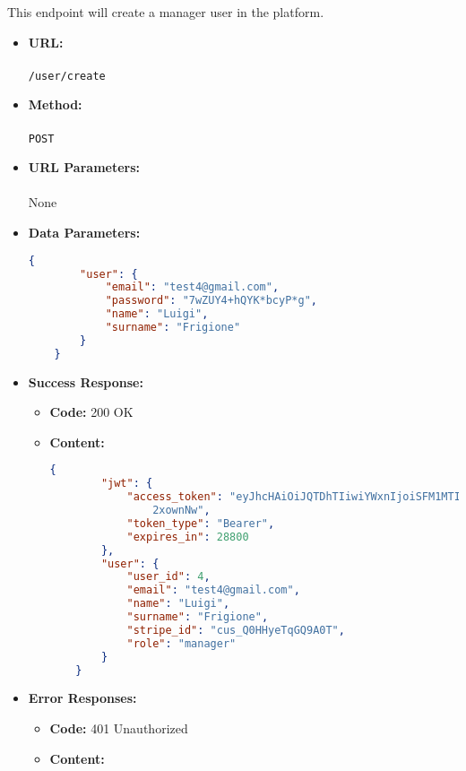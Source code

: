 

This endpoint will create a manager user in the platform.

\begin{itemize}
    \item \textbf{URL:} \\\\\texttt{/user/create}
    \item \textbf{Method:} \\\\\texttt{POST}
    \item \textbf{URL Parameters:} \\\\None
    \item \textbf{Data Parameters:}
	\begin{lstlisting}[language=json]
    {
        "user": {
            "email": "test4@gmail.com",
            "password": "7wZUY4+hQYK*bcyP*g",
            "name": "Luigi",
            "surname": "Frigione"
        }
    }
	\end{lstlisting}
    \item \textbf{Success Response:}
		\begin{itemize}
			\item[$\circ$] \textbf{Code:} 200 OK
			\item[] \textbf{Content:}
			\begin{lstlisting}[language=json]
    {
        "jwt": {
            "access_token": "eyJhcHAiOiJQTDhTIiwiYWxnIjoiSFM1MTIifQ.eyJ1aWQiOjQsInJvbCI6Im1hbmFnZXI iLCJzdHIiOiJjdXNfUTBISHllVHFHUTlBMFQiLCJkYXQiOjE3MTQyNzQxMjI3NDB9.tmQUn cw2vRxchlJowzwfp7rJSNeA8QvrZEXhYTF_e98Y3iggUqJKFZUr8IWHM7Ypa-txlQecFGN 
                2xownNw",
            "token_type": "Bearer",
            "expires_in": 28800
        },
        "user": {
            "user_id": 4,
            "email": "test4@gmail.com",
            "name": "Luigi",
            "surname": "Frigione",
            "stripe_id": "cus_Q0HHyeTqGQ9A0T",
            "role": "manager"
        }
    }
			\end{lstlisting}
		\end{itemize}
	   \item \textbf{Error Responses:}
    	\begin{itemize}
			\item[$\circ$] \textbf{Code:} 401 Unauthorized
			\item[] \textbf{Content:}
			\begin{lstlisting}[language=json]

\end{lstlisting}
\end{itemize}
\end{itemize}
